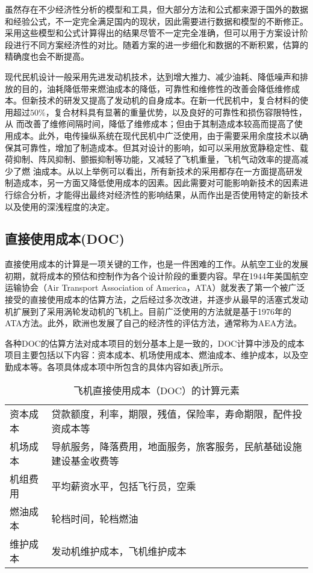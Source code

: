 虽然存在不少经济性分析的模型和工具，但大部分方法和公式都来源于国外的数据和经验公式，不一定完全满足国内的现状，因此需要进行数据和模型的不断修正。采用这些模型和公式计算得出的结果尽管不一定完全准确，但可以用于方案设计阶段进行不同方案经济性的对比。随着方案的进一步细化和数据的不断积累，估算的精确度也会不断提高。

现代民机设计一般采用先进发动机技术，达到增大推力、减少油耗、降低噪声和排放的目的，油耗降低带来燃油成本的降低，可靠性和维修性的改善会降低维修成本。但新技术的研发又提高了发动机的自身成本。在新一代民机中，复合材料的使用超过$50\%$，复合材料具有显著的重量优势，以及良好的可靠性和损伤容限特性，从
而改善了维修间隔时间，降低了维修成本；但由于其制造成本较高而提高了使用成本。此外，电传操纵系统在现代民机中广泛使用，由于需要采用余度技术以确保其可靠性，增加了制造成本。但其对设计的影响，如可以采用放宽静稳定性、载荷抑制、阵风抑制、颤振抑制等功能，又减轻了飞机重量，飞机气动效率的提高减少了燃
油成本。从以上举例可以看出，所有新技术的采用都存在一方面提高研发制造成本，另一方面又降低使用成本的因素。因此需要对可能影响新技术的因素进行综合分析，才能得出最终对经济性的影响结果，从而作出是否使用特定的新技术以及使用的深浅程度的决定。

\subsection{直接使用成本(DOC)}
直接使用成本的计算是一项关键的工作，也是一件困难的工作。从航空工业的发展初期，就将成本的预估和控制作为各个设计阶段的重要内容。早在1944年美国航空运输协会（Air Transport Association of America，ATA）就发表了第一个被广泛接受的直接使用成本的估算方法，之后经过多次改进，并逐步从最早的活塞式发动机扩展到了采用涡轮发动机的飞机上。目前广泛使用的方法就是基于1976年的ATA方法。此外，欧洲也发展了自己的经济性的评估方法，通常称为AEA方法。

各种DOC的估算方法对成本项目的划分基本上是一致的，DOC计算中涉及的成本项目主要包括以下内容：资本成本、机场使用成本、燃油成本、维护成本，以及空勤成本等。各项具体成本项中所包含的具体内容如表\ref{table_docsum}所示。

\begin{table}
\centering \caption{飞机直接使用成本（DOC）的计算元素}
\label{table_docsum}     %
\begin{tabular}{p{}p{}}
\hline \hline
资本成本&贷款额度，利率，期限，残值，保险率，寿命期限，配件投资成本等 \\
机场成本&导航服务，降落费用，地面服务，旅客服务，民航基础设施建设基金收费等 \\
机组费用&平均薪资水平，包括飞行员，空乘\\
燃油成本&轮档时间，轮档燃油 \\
维护成本&发动机维护成本，飞机维护成本 \\
\hline \hline
\end{tabular}
\end{table}

